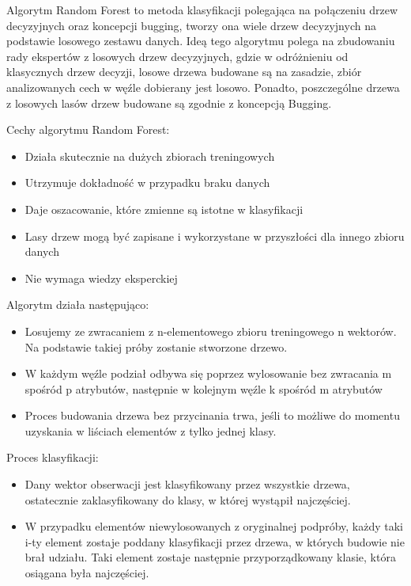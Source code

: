 \documentclass[brudnopis]{xmgr}
\begin{document}
Algorytm Random Forest\cite{3}\cite{13} to metoda klasyfikacji polegająca na połączeniu drzew decyzyjnych oraz koncepcji bugging, tworzy ona wiele drzew decyzyjnych na podstawie losowego zestawu danych. Ideą tego algorytmu polega na zbudowaniu rady ekspertów z losowych drzew decyzyjnych, gdzie w odróżnieniu od klasycznych drzew decyzji, losowe drzewa budowane są na zasadzie, zbiór analizowanych cech w węźle dobierany jest losowo. Ponadto, poszczególne drzewa z losowych lasów drzew budowane są zgodnie z koncepcją Bugging.

Cechy algorytmu Random Forest:
\begin{itemize}
\item
Działa skutecznie na dużych zbiorach treningowych
\item
Utrzymuje dokładność w przypadku braku danych
\item
Daje oszacowanie, które zmienne są istotne w klasyfikacji
\item
Lasy drzew mogą być zapisane i wykorzystane w przyszłości dla innego zbioru danych
\item
Nie wymaga wiedzy eksperckiej
\end{itemize}

Algorytm działa następująco:
\begin{itemize}
\item
Losujemy ze zwracaniem z n-elementowego zbioru treningowego n wektorów. Na podstawie takiej próby zostanie stworzone drzewo.
\item
W każdym węźle podział odbywa się poprzez wylosowanie bez zwracania m spośród p atrybutów, następnie w kolejnym węźle k spośród m atrybutów
\item
Proces budowania drzewa bez przycinania trwa, jeśli to możliwe do momentu uzyskania w liściach elementów z tylko jednej klasy.
\end{itemize}
\newpage

Proces klasyfikacji:
\begin{itemize}
\item
Dany wektor obserwacji jest klasyfikowany przez wszystkie drzewa, ostatecznie zaklasyfikowany do klasy, w której wystąpił najczęściej.
\item
W przypadku elementów niewylosowanych z oryginalnej podpróby, każdy taki i-ty element zostaje poddany klasyfikacji przez drzewa, w których budowie nie brał udziału. Taki element zostaje następnie przyporządkowany klasie, która osiągana była najczęściej.
\end{itemize}
\end{document}
